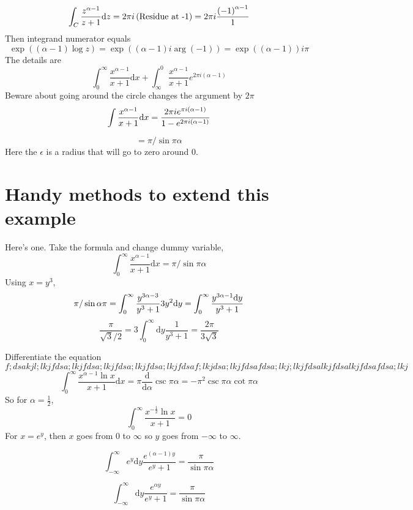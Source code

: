 \documentclass[letter]{article}
\begin{document}
\[
\int_C \frac{z^{\alpha - 1}}{z+1} \mathrm{d} z = 
2 \pi i 
\left(\text{Residue at -1}\right) = 
2 \pi i  { 
	\left(-1\right)^{\alpha - 1}\over 
	1
}
\] 
Then integrand numerator equals 
\[
\exp \left(\left( \alpha - 1 \right)  \log z \right)
= \exp 
\left( 
\left(\alpha - 1\right) i \arg (-1 ) 
\right)
= 
\exp \left(
	\left(\alpha - 1\right)
\right) i \pi 
\]
The details are
\[
\int _0^{\infty} \frac{x^{\alpha -1} }{x + 1} \mathrm{d} x + \int_\infty^0 \frac{x^{\alpha - 1}}{x+1} e^{2 \pi i \left(\alpha - 1\right)}
\] 
Beware about going around the circle changes the argument by $2\pi $
\[
\int{ x^{\alpha - 1} \over x + 1} \mathrm{d}  x = 
{ 
2\pi i e ^{ \pi i (\alpha - 1) } \over 1 - e^{2 \pi i (\alpha - 1)} } 
\]

\[
= \pi / \sin \pi \alpha
\] 
Here the $\epsilon$ is a radius that will go to zero around $0$.

\section*{Handy methods to extend this example} 
Here's one. Take the formula and change dummy variable, 
\[
\boxed{
\int_0 ^{ \infty} \frac{x^{\alpha - 1}}{x + 1} \mathrm{d}  x = \pi / \sin \pi \alpha
}
\] 
Using $x = y^3$, 
\[
\pi / \sin \alpha \pi = 
\int_0^{\infty} \frac{y ^{3 \alpha - 3} }{ y^3 + 1} 3y^2 \mathrm{d} y 
= 
\int_0^{\infty} 
{y ^{3 \alpha -1} \mathrm{d} y \over y^3 + 1 } 
\] 
\[
\frac{\pi}{\sqrt{3} / 2} = 3 \int_0^{\infty} \mathrm{d} y \frac{1}{y^3 + 1} = \frac{2 \pi }{3 \sqrt{3} }
\]

Differentiate the equation 
\[
f;dsakjl;lkjfdsa;lkjfdsa;lkjfdsa;lkjfdsa;lkjfdsaf;lkjdsa;lkjfdsafdsa;lkj;lkjfdsalkjfdsalkjfdsafdsa;lkj
\]
\[
\int_0^{\infty} \frac{x^{\alpha - 1} \ln x}{x + 1} \mathrm{d}  x = 
\pi \frac{\mathrm{d} }{\mathrm{d}  \alpha} \csc \pi \alpha = - \pi ^2 \csc \pi \alpha \cot \pi \alpha
\]
So for $\alpha = \frac{1}{2}$, 
\[
\int_0^{\infty} \frac{x^{- \frac{1}{ 2}} \ln x}{x + 1} = 0
\]
For $x=e^{y}$, then $x$ goes from $0$ to $\infty$ so $y$ goes from $-\infty$ to $\infty$. 

\[
	\int_{-\infty}^{\infty} e^{y} \mathrm{d} y \frac{e^{(\alpha - 1) y }}{e^{ y } + 1} = \frac{\pi}{\sin \pi \alpha}
\] 


\[
	\int_{-\infty}^{\infty} \mathrm{d} y \frac{e^{\alpha y  }}{e^{ y } + 1} = \frac{\pi}{\sin \pi \alpha}
\] 
\end{document}
